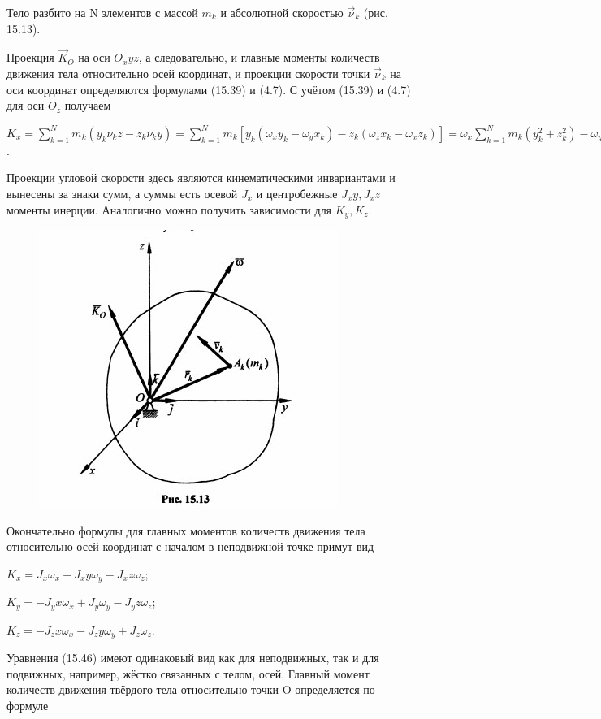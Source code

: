 {\begin{center}
	  \par Тело разбито на N элементов  с массой $m_k$ и абсолютной  скоростью $\vec\nu_k$ (рис. 15.13).
	  \par Проекция $\vec K_O$ на оси $O_xyz$, а следовательно, и главные моменты количеств движения тела относительно осей координат, и проекции скорости точки $\vec\nu_k$ на оси координат определяются формулами (15.39) и (4.7). С учётом (15.39) и (4.7) для оси $O_z$ получаем

	  \par $K_x = \sum\limits_{k=1}^N m_k(y_k \nu_kz - z_k \nu_ky) = \sum\limits_{k=1}^N m_k[y_k(\omega_x y_k - \omega_y x_k) - z_k(\omega_z x_k - \omega_x z_k)] = \omega_x \sum\limits_{k=1}^N m_k(y_k^2 + z_k^2) - \omega_y \sum\limits_{k=1}^N m_k x_k y_k - \omega_z \sum\limits_{k=1}^N m_k x_k z_k$.

	  \par Проекции угловой скорости здесь являются кинематическими инвариантами и вынесены за знаки сумм, а суммы есть осевой $J_x$ и центробежные $J_xy, J_xz$ моменты инерции. Аналогично можно  получить зависимости для $K_y, K_z$.

	  \par \begin{figure}[H]
        \centering\includegraphics[scale=0.7]{img/15.13.jpg} 
        \end{figure}

	  \par Окончательно формулы для главных моментов количеств движения тела относительно осей координат с началом в неподвижной точке примут вид

	  \par $K_x = J_x \omega_x - J_xy \omega_y - J_xz \omega_z$;
	  \par $K_y = -J_yx \omega_x + J_y \omega_y - J_yz \omega_z$;
	  \par $K_z = -J_zx \omega_x - J_zy \omega_y + J_z \omega_z$. 
   \par Уравнения (15.46) имеют одинаковый вид как для неподвижных, так и для подвижных, например, жёстко связанных с телом, осей. 
	  Главный момент количеств движения твёрдого тела относительно точки O определяется по формуле


\end{center}}
